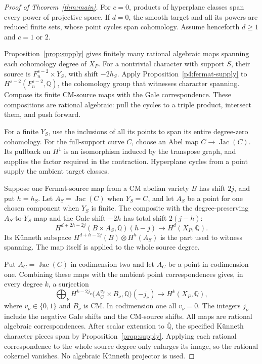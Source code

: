 \documentclass[11pt]{article}
\newcommand{\Q}{\mathbb Q}
\newcommand{\Jac}{\operatorname{Jac}}
\newcommand{\kk}{\overline{\Q}}
\theoremstyle{plain}
\theoremstyle{definition}
\theoremstyle{remark}
\numberwithin{equation}{section}
\begin{document}
\begin{proof}[Proof of Theorem~\ref{thm:main}]
For \(c=0\), products of hyperplane classes span every power of
projective space.  If \(d=0\), the smooth target and all its powers
are reduced finite sets, whose point cycles span cohomology.
Assume henceforth \(d\geq1\) and \(c=1\) or \(2\).

Proposition~\ref{prop:supply} gives finitely many rational algebraic
maps spanning each cohomology degree of \(X_P\).  For a nontrivial
character with support \(S\), their source is
\(F_n^{s-2}\times Y_S\), with shift \(-2h_S\).  Apply
Proposition~\ref{p4:fermat-supply} to
\(H^{s-2}(F_n^{s-2},\Q)\), the cohomology group that witnesses
character spanning.  Compose its finite
CM-source maps with the Gale correspondence.  These compositions
are rational algebraic: pull the cycles to a triple product,
intersect them, and push forward.

For a finite \(Y_S\), use the inclusions of all its points to
span its entire degree-zero cohomology.  For the full-support
curve \(C\), choose an Abel map \(C\to\Jac(C)\).  Its pullback
on \(H^1\) is an isomorphism induced by the transpose graph,
and supplies the factor required in the contraction.  Hyperplane
cycles from a point supply the ambient target classes.

Suppose one Fermat-source map from a CM abelian variety \(B\)
has shift \(2j\), and put \(h=h_S\).
Let \(A_S=\Jac(C)\) when \(Y_S=C\), and let \(A_S\) be a point
for one chosen component when \(Y_S\) is finite.  The composite with the
degree-preserving \(A_S\)-to-\(Y_S\) map and the Gale shift
\(-2h\) has total shift \(2(j-h)\):
\[
 H^{d+2h-2j}(B\times A_S,\Q)(h-j)
       \longrightarrow H^d(X_P,\Q).
\]
Its K\"unneth subspace
\(H^{d+h-2j}(B)\otimes H^h(A_S)\) is the part used to witness
spanning.  The map itself is applied to the whole source degree.

Put \(A_C=\Jac(C)\) in codimension two and let \(A_C\) be a point
in codimension one.  Combining these maps with the ambient point
correspondences gives, in every degree \(k\), a surjection
\[
 \bigoplus_\nu
 H^{k-2j_\nu}\bigl(A_C^{v_\nu}\times B_\nu,\Q\bigr)(-j_\nu)
 \longrightarrow H^k(X_P,\Q),                         \tag{*}
\]
where \(v_\nu\in\{0,1\}\) and \(B_\nu\) is CM.  In codimension
one all \(v_\nu=0\).  The integers \(j_\nu\) include the negative
Gale shifts and the CM-source shifts.  All maps are rational
algebraic correspondences.  After scalar extension to \(\kk\), the
specified K\"unneth character pieces span by Proposition~\ref{prop:supply}.
Applying each rational correspondence to the whole source degree
only enlarges its image, so the rational
cokernel vanishes.  No algebraic K\"unneth projector is used.


\end{proof}
\end{document}
